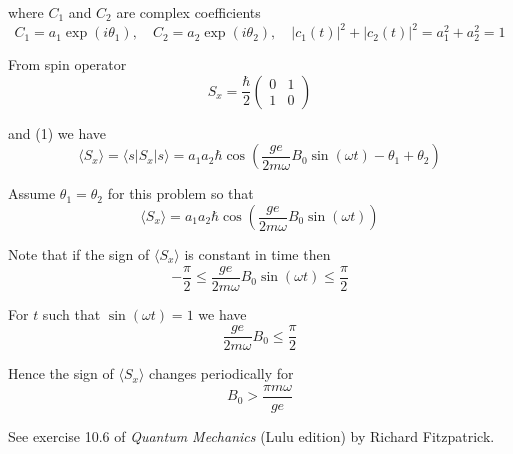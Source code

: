 where $C_1$ and $C_2$ are complex coefficients
\begin{equation*}
C_1=a_1\exp(i\theta_1),\quad C_2=a_2\exp(i\theta_2),\quad|c_1(t)|^2+|c_2(t)|^2=a_1^2+a_2^2=1
\end{equation*}

From spin operator
\begin{equation*}
S_x=\frac{\hbar}{2}\begin{pmatrix}0&1\\1&0\end{pmatrix}
\end{equation*}

and (1) we have
\begin{equation*}
\langle S_x\rangle=\langle s|S_x|s\rangle
=a_1a_2\hbar\cos\left(\frac{ge}{2m\omega}B_0\sin(\omega t)-\theta_1+\theta_2\right)
\tag{2}
\end{equation*}

Assume $\theta_1=\theta_2$ for this problem so that
\begin{equation*}
\langle S_x\rangle=a_1a_2\hbar\cos\left(\frac{ge}{2m\omega}B_0\sin(\omega t)\right)
\end{equation*}

Note that if the sign of $\langle S_x\rangle$ is constant in time then
\begin{equation*}
-\frac{\pi}{2}\le\frac{ge}{2m\omega}B_0\sin(\omega t)\le\frac{\pi}{2}
\end{equation*}

For $t$ such that $\sin(\omega t)=1$ we have
\begin{equation*}
\frac{ge}{2m\omega}B_0\le\frac{\pi}{2}
\end{equation*}

Hence the sign of $\langle S_x\rangle$ changes periodically for
\begin{equation*}
B_0>\frac{\pi m\omega}{ge}
\end{equation*}

See exercise 10.6 of {\it Quantum Mechanics}
(Lulu edition) by Richard Fitzpatrick.


